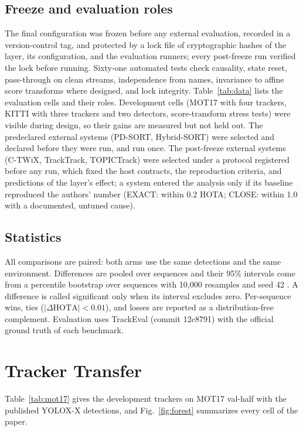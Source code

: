 \documentclass[journal]{new-aiaa}
\begin{document}


\subsection{Freeze and evaluation roles}
The final configuration was frozen before any external evaluation, recorded in a version-control tag, and protected by a lock file of cryptographic hashes of the layer, its configuration, and the evaluation runners; every post-freeze run verified the lock before running. Sixty-one automated tests check causality, state reset, pass-through on clean streams, independence from names, invariance to affine score transforms where designed, and lock integrity. Table~\ref{tab:data} lists the evaluation cells and their roles. Development cells (MOT17 with four trackers, KITTI with three trackers and two detectors, score-transform stress tests) were visible during design, so their gains are measured but not held out. The predeclared external systems (PD-SORT, Hybrid-SORT) were selected and declared before they were run, and run once. The post-freeze external systems (C-TWiX, TrackTrack, TOPICTrack) were selected under a protocol registered before any run, which fixed the host contracts, the reproduction criteria, and predictions of the layer's effect; a system entered the analysis only if its baseline reproduced the authors' number (EXACT: within 0.2 HOTA; CLOSE: within 1.0 with a documented, untuned cause).



\subsection{Statistics}
All comparisons are paired: both arms use the same detections and the same environment. Differences are pooled over sequences and their 95\% intervals come from a percentile bootstrap over sequences with 10,000 resamples and seed 42 \cite{efron1993bootstrap}. A difference is called significant only when its interval excludes zero. Per-sequence wins, ties ($|\Delta\mathrm{HOTA}|<0.01$), and losses are reported as a distribution-free complement. Evaluation uses TrackEval (commit 12c8791) with the official ground truth of each benchmark.

\section{Tracker Transfer}\label{sec:tracker}
Table~\ref{tab:mot17} gives the development trackers on MOT17 val-half with the published YOLOX-X detections, and Fig.~\ref{fig:forest} summarizes every cell of the paper.
\end{document}
